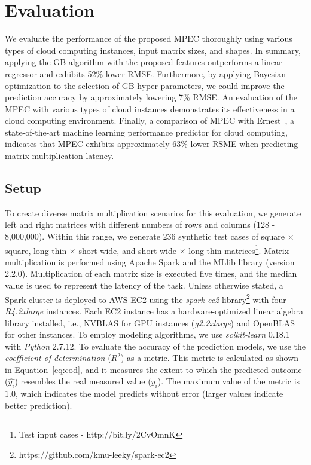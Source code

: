 \documentclass[10pt, conference, compsocconf]{IEEEtran}
\begin{document}
\section{Evaluation}{\label{sec:eval}}
We evaluate the performance of the proposed MPEC thoroughly using various types of cloud computing instances, input matrix sizes, and shapes. In summary, applying the GB algorithm with the proposed features outperforms a linear regressor and exhibits 52\% lower RMSE. Furthermore, by applying Bayesian optimization to the selection of GB hyper-parameters, we could improve the prediction accuracy by approximately lowering 7\% RMSE. An evaluation of the MPEC with various types of cloud instances demonstrates its effectiveness in a cloud computing environment. Finally, a comparison of MPEC with Ernest~\cite{ernest}, a state-of-the-art machine learning performance predictor for cloud computing, indicates that MPEC exhibits approximately 63\% lower RSME when predicting matrix multiplication latency.

\subsection{Setup}
To create diverse matrix multiplication scenarios for this evaluation, we generate left and right matrices with different numbers of rows and columns (128 - 8,000,000). Within this range, we generate 236 synthetic test cases of square $\times$ square, long-thin $\times$ short-wide, and short-wide $\times$ long-thin matrices\footnote{Test input cases - http://bit.ly/2CvOmnK}. Matrix multiplication is performed using Apache Spark and the MLlib library (version 2.2.0). Multiplication of each matrix size is executed five times, and the median value is used to represent the latency of the task. Unless otherwise stated, a Spark cluster is deployed to AWS EC2 using the \textit{spark-ec2} library\footnote{https://github.com/kmu-leeky/spark-ec2} with four \textit{R4.2xlarge} instances. Each EC2 instance has a hardware-optimized linear algebra library installed, i.e., NVBLAS for GPU instances (\textit{g2.2xlarge}) and OpenBLAS for other instances. To employ modeling algorithms, we use \textit{scikit-learn} 0.18.1 with \textit{Python} 2.7.12. To evaluate the accuracy of the prediction models, we use the \textit{coefficient of determination} ($R^2$) as a metric. This metric is calculated as shown in Equation~\ref{eq:cod}, and it measures the extent to which the predicted outcome ($\hat{y_i}$) resembles the real measured value ($y_i$). The maximum value of the metric is $1.0$, which indicates the model predicts without error (larger values indicate better prediction).
\end{document}

